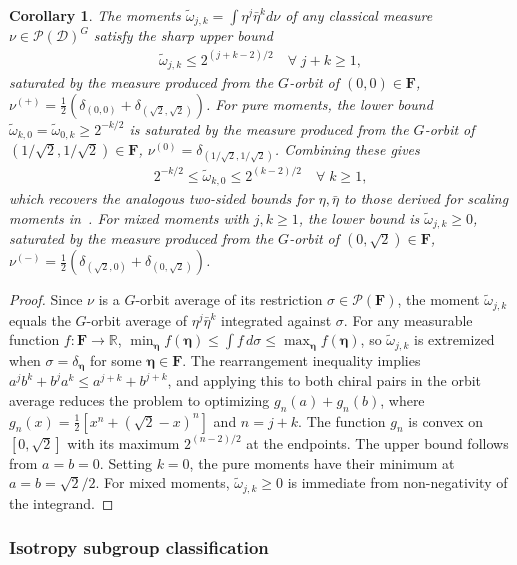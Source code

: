 \documentclass[a4paper,11pt]{article}
\theoremstyle{plain}
\newtheorem{cor}{Corollary}
\theoremstyle{definition}
\theoremstyle{remark}
\newcommand{\bs}[1]{\boldsymbol{#1}}
\newcommand{\ba}{\begin{equation} \begin{aligned}}
\newcommand{\ea}{\end{aligned} \end{equation}}
\newcommand{\mbf}{\mathbf}
\begin{document}
\begin{cor}
\label{cor:momentbounds}
The moments $\tilde{\omega}_{j,k} = \int \eta^j \bar{\eta}^k d\nu$ of any classical measure $\nu \in \mathcal{P}(\mathcal{D})^G$ satisfy the sharp upper bound
\ba
\tilde{\omega}_{j,k} \leq 2^{(j+k-2)/2} \quad \forall \; j+k \geq 1,
\ea
saturated by the measure produced from the $G$-orbit of $(0,0) \in \mbf{F}$, $\nu^{(+)} = \frac{1}{2}\left(\delta_{(0,0)} + \delta_{(\sqrt{2},\sqrt{2})}\right)$. For pure moments, the lower bound $\tilde{\omega}_{k,0} =\tilde{\omega}_{0,k}\geq 2^{-k/2}$ is saturated by the measure produced from the $G$-orbit of $(1/\sqrt{2},1/\sqrt{2}) \in \mbf{F}$, $\nu^{(0)} = \delta_{(1/\sqrt{2},1/\sqrt{2})}$. Combining these gives
\ba
2^{-k/2} \leq \tilde{\omega}_{k,0} \leq 2^{(k-2)/2} \quad \forall \; k \geq 1,
\ea
which recovers the analogous two-sided bounds for $\eta,\bar{\eta}$ to those derived for scaling moments in~\cite{Poland:2024hvb}. For mixed moments with $j,k \geq 1$, the lower bound is $\tilde{\omega}_{j,k} \geq 0$, saturated by the measure produced from the $G$-orbit of $(0,\sqrt{2})\in\mbf{F}$, $\nu^{(-)} = \frac{1}{2}\left(\delta_{(\sqrt{2},0)} + \delta_{(0,\sqrt{2})}\right)$.
\end{cor}
\begin{proof} Since $\nu$ is a $G$-orbit average of its restriction $\sigma \in \mathcal{P}(\mathbf{F})$, the moment $\tilde{\omega}_{j,k}$ equals the $G$-orbit average of $\eta^j\bar{\eta}^k$ integrated against $\sigma$. For any measurable function $f: \mbf{F}\to\mathbb{R}$, $\min_{\bs{\eta} }f(\bs{\eta}) \leq \int f \,d\sigma \leq\max_{\bs{\eta} }f(\bs{\eta})$, so $\tilde{\omega}_{j,k}$ is extremized when $\sigma = \delta_{\bs{\eta}}$ for some $\bs{\eta} \in \mathbf{F}$. The rearrangement inequality implies $a^jb^k + b^ja^k \leq a^{j+k} + b^{j+k}$, and applying this to both chiral pairs in the orbit average reduces the problem to optimizing $g_n(a) + g_n(b)$, where $g_n(x) = \frac{1}{2}[x^n + (\sqrt{2}-x)^n]$ and $n = j+k$. The function $g_n$ is convex on $[0,\sqrt{2}]$ with its maximum $2^{(n-2)/2}$ at the endpoints. The upper bound follows from $a = b = 0$. Setting $k=0$, the pure moments have their minimum at $a = b = \sqrt{2}/2$. For mixed moments, $\tilde{\omega}_{j,k} \geq 0$ is immediate from non-negativity of the integrand.
\end{proof}


\subsubsection{Isotropy subgroup classification}
\end{document}
